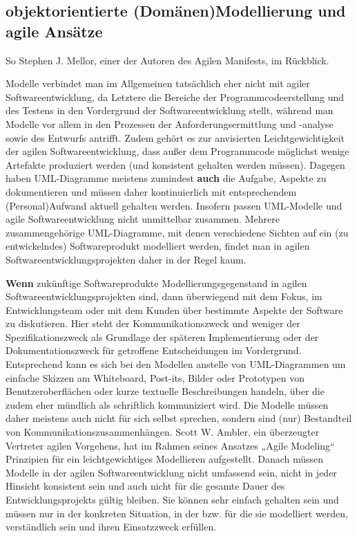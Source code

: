 \subsection{objektorientierte (Domänen)Modellierung und agile Ansätze}
\label{sec:Kap-3.2.4}


So Stephen J. Mellor, einer der Autoren des Agilen Manifests, im Rückblick.

\pagebreak %

Modelle verbindet man im Allgemeinen tatsächlich eher nicht mit agiler Softwareentwicklung, da Letztere die Bereiche der Programmcodeerstellung und des Testens in den Vordergrund der Softwareentwicklung stellt, während man Modelle vor allem in den Prozessen der Anforderungsermittlung und -analyse sowie des Entwurfs antrifft. Zudem gehört es zur anvisierten Leichtgewichtigkeit der agilen Softwareentwicklung, dass außer dem Programmcode möglichst wenige Artefakte produziert werden (und konsistent gehalten werden müssen). Dagegen haben UML-Diagramme meistens zumindest  \textbf{auch} die Aufgabe, Aspekte zu dokumentieren und müssen daher kontinuierlich mit entsprechendem (Personal)Aufwand aktuell gehalten werden. Insofern passen UML-Modelle und agile Softwareentwicklung nicht unmittelbar zusammen. Mehrere zusammengehörige UML-Diagramme, mit denen verschiedene Sichten auf ein (zu entwickelndes) Softwareprodukt modelliert werden, findet man in agilen Softwareentwicklungsprojekten daher in der Regel kaum.

\textbf{Wenn} zukünftige Softwareprodukte Modellierungsgegenstand in agilen Software\-entwicklungsprojekten sind, dann überwiegend mit dem Fokus, im Entwicklungsteam oder mit dem Kunden über bestimmte Aspekte der Software zu diskutieren. Hier steht der Kommunikationszweck 
und weniger der Spezifikationszweck als Grundlage der späteren Implementierung oder der Dokumentationszweck für getroffene Entscheidungen im Vordergrund. Entsprechend kann es sich bei den Modellen anstelle von UML-Diagrammen um einfache Skizzen am Whiteboard, Post-its, Bilder oder Prototypen von Benutzeroberflächen oder kurze textuelle Beschreibungen handeln, über die zudem eher mündlich als schriftlich kommuniziert wird. Die Modelle müssen daher meistens auch nicht für sich selbst sprechen, sondern sind (nur) Bestandteil von Kommunikationszusammenhängen. Scott  W. Ambler, 
ein überzeugter Vertreter agilen Vorgehens, hat im Rahmen seines Ansatzes „Agile Modeling“ \cite{amb02} Prinzipien für ein leichtgewichtiges Modellieren aufgestellt. Danach müssen Modelle in der agilen Softwareentwicklung nicht umfassend sein, nicht in jeder Hinsicht konsistent sein und auch nicht für die gesamte Dauer des Entwicklungsprojekts gültig bleiben. Sie können sehr einfach gehalten sein und müssen nur in der konkreten Situation, in der bzw. für die sie modelliert werden, verständlich sein und ihren Einsatzzweck erfüllen.

